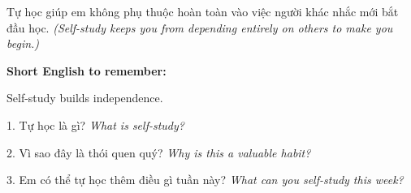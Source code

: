 \begin{baihoc}
Tự học giúp em không phụ thuộc hoàn toàn vào việc người khác nhắc mới bắt đầu học.
\textit{(Self-study keeps you from depending entirely on others to make you begin.)}
\end{baihoc}

\begin{ghinhoanh}
\textbf{Short English to remember:}

Self-study builds independence.

\end{ghinhoanh}

\begin{tuhocnhanh}
1. Tự học là gì? \textit{What is self-study?}

2. Vì sao đây là thói quen quý? \textit{Why is this a valuable habit?}

3. Em có thể tự học thêm điều gì tuần này? \textit{What can you self-study this week?}
\end{tuhocnhanh}
\ngancach